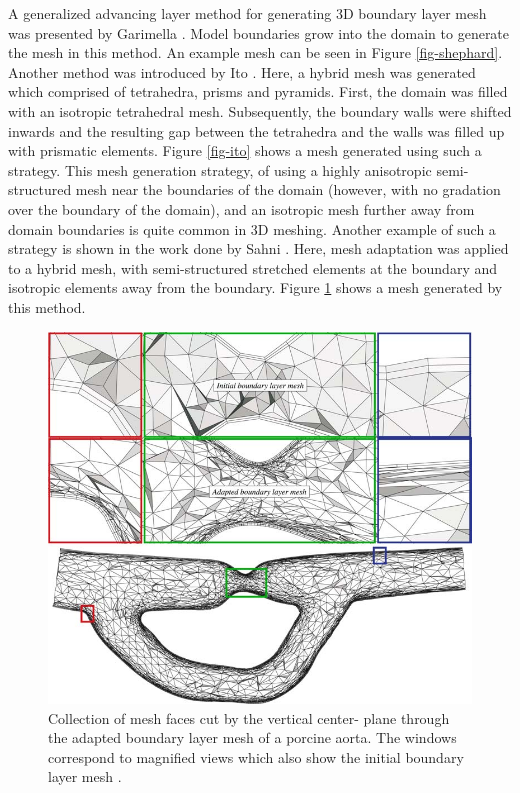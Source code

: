 A generalized advancing layer method for generating 3D boundary layer mesh was presented by Garimella \etal \cite{garimella2000boundary}. Model boundaries grow into the domain to generate the mesh in this method. An example mesh can be seen in Figure \ref{fig-shephard}. Another method was introduced by Ito \etal \cite{ito2002unstructured}. Here, a hybrid mesh was generated which comprised of tetrahedra, prisms and pyramids. First, the domain was filled with an isotropic tetrahedral mesh. Subsequently, the boundary walls were shifted inwards and the resulting gap between the tetrahedra and the walls was filled up with prismatic elements. Figure \ref{fig-ito} shows a mesh generated using such a strategy. This mesh generation strategy, of using a highly anisotropic semi-structured mesh near the boundaries of the domain (however, with no gradation over the boundary of the domain), and an isotropic mesh further away from domain boundaries is quite common in 3D meshing. Another example of such a strategy is shown in the work done by Sahni \etal \cite{sahni2008adaptive}. Here, mesh adaptation was applied to a hybrid mesh, with semi-structured stretched elements at the boundary and isotropic elements away from the boundary. Figure \ref{fig-sahni} shows a mesh generated by this method.

\begin{figure}
	\centering
	\includegraphics[width=0.8\linewidth]{img/intro/lit/sahni.png}
	\caption[Adapted boundary layer mesh of a porcine aorta\cite{sahni2008adaptive}]{ Collection of mesh faces cut by the vertical center- plane through the adapted boundary layer mesh of a porcine aorta. The windows correspond to magnified views which also show the initial boundary layer mesh \cite{sahni2008adaptive}.}
	\label{fig-sahni}
\end{figure}

